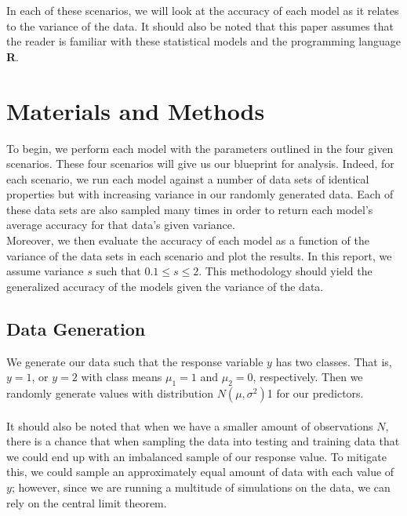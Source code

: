 \documentclass[11pt, oneside]{article}
\begin{document}
In each of these scenarios, we will look at the accuracy of each model as it relates to the variance of the data. It should also be noted that this paper assumes that the reader is familiar with these statistical models and the programming language \textbf\textsf{R}.

\pagebreak




\section*{Materials and Methods}
To begin, we perform each model with the parameters outlined in the four given scenarios. These four scenarios will give us our blueprint for analysis. Indeed, for each scenario, we run each model against a number of data sets of identical properties but with increasing variance in our randomly generated data. Each of these data sets are also sampled many times in order to return each model's average accuracy for that data's given variance.\\
Moreover, we then evaluate the accuracy of each model as a function of the variance of the data sets in each scenario and plot the results. In this report, we assume variance $s$ such that $0.1\leq s\leq 2$. This methodology should yield the generalized accuracy of the models given the variance of the data.
 

\subsection*{Data Generation} 
We generate our data such that the response variable $y$ has two classes. That is, $y=1$, or $y=2$ with class means $\mu_1=1$ and $\mu_2=0$, respectively. Then we randomly generate values with distribution $N(\mu, \sigma^2)$1 for our predictors.\\
\\
It should also be noted that when we have a smaller amount of observations $N$, there is a chance that when sampling the data into testing and training data that we could end up with an imbalanced sample of our response value. To mitigate this, we could sample an approximately equal amount of data with each value of $y$; however, since we are running a multitude of simulations on the data, we can rely on the central limit theorem.\\ 
\end{document}
